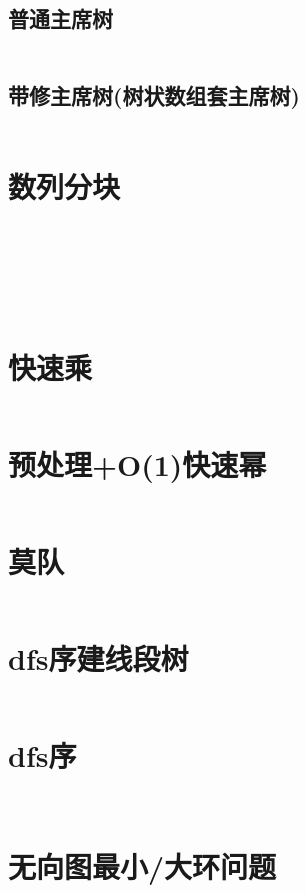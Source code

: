 \documentclass[a4paper,11pt]{article}
\begin{document}
\subsection*{普通主席树}
\inputminted[]{c++}{Template/DataStructure/ChairManTreeI.cpp}
\newpage
\subsection*{带修主席树(树状数组套主席树)}
\inputminted[]{c++}{Template/DataStructure/ChairManTreeII.cpp}

\newpage
\section*{数列分块}
\inputminted[]{c++}{Template/Other/SeqBlockI.cpp}
\newpage
\inputminted[]{c++}{Template/Other/SeqBlockII.cpp}
\newpage
\inputminted[]{c++}{Template/Other/SeqBlockIII.cpp}
\newpage
\inputminted[]{c++}{Template/Other/SeqBlockIV.cpp}
\newpage
\inputminted[]{c++}{Template/Other/SeqBlockV.cpp}
\newpage
\inputminted[]{c++}{Template/Other/SeqBlockVI.cpp}
\newpage
\inputminted[]{c++}{Template/Other/SeqBlockVII.cpp}
\newpage
\section*{快速乘}
\inputminted[]{c++}{Template/Other/qMul.cpp}
\section*{预处理+O(1)快速幂}
\inputminted[]{c++}{Template/Other/PowMod.cpp}

\newpage
\section*{莫队}
\inputminted[]{c++}{Template/Segment/Mo.cpp}
\newpage
\section*{dfs序建线段树}
\inputminted[]{c++}{Template/Segment/dfsSegTree.cpp}
\newpage
\section*{dfs序}
\inputminted[]{c++}{Template/Segment/dfs.cpp}
\newpage
\inputminted[]{c++}{Template/Other/cdq_3d_lis.cpp}

\newpage
\section*{无向图最小/大环问题}
\end{document}
